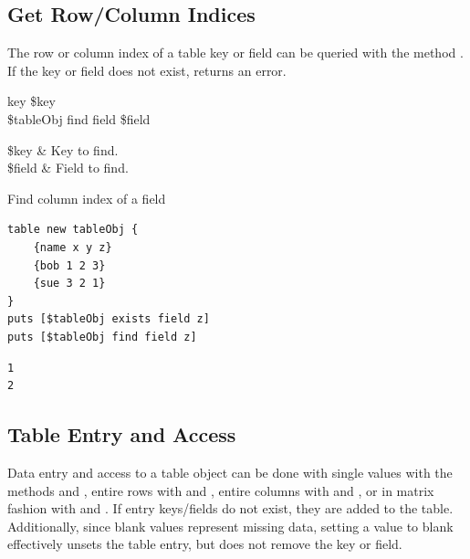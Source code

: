 \subsection{Get Row/Column Indices}
The row or column index of a table key or field can be queried with the method . 
If the key or field does not exist, returns an error.

\begin{syntax}
 key \$key \\
\$tableObj find field \$field
\end{syntax}
\begin{args}
\$key & Key to find. \\
\$field & Field to find.
\end{args}

\begin{example}{Find column index of a field}
\begin{lstlisting}
table new tableObj {
    {name x y z}
    {bob 1 2 3}
    {sue 3 2 1}
}
puts [$tableObj exists field z]
puts [$tableObj find field z]
\end{lstlisting}
\tcblower
\begin{lstlisting}
1
2
\end{lstlisting}
\end{example}

\clearpage
\subsection{Table Entry and Access}
Data entry and access to a table object can be done with single values with the methods  and , entire rows with  and , entire columns with  and , or in matrix fashion with  and . 
If entry keys/fields do not exist, they are added to the table. 
Additionally, since blank values represent missing data, setting a value to blank effectively unsets the table entry, but does not remove the key or field. 
